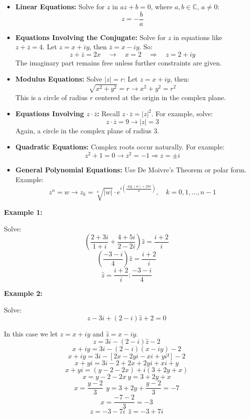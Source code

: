 \begin{itemize}[label=\(-\)]
	\item \textbf{Linear Equations:}
	      Solve for \( z \) in \( az + b = 0 \), where \( a, b \in \mathbb{C} \), \( a \neq 0 \):
	      \[
		      z = -\frac{b}{a}
	      \]

	\item \textbf{Equations Involving the Conjugate:}
	      Solve for \( z \) in equations like \( z + \overline{z} = 4 \).
	      Let \( z = x + iy \), then \( \overline{z} = x - iy \). So:
	      \[
		      z + \overline{z} = 2x \quad \to \quad x = 2 \quad \Rightarrow \quad z = 2 + iy
	      \]
	      The imaginary part remains free unless further constraints are given.

	\item \textbf{Modulus Equations:}
	      Solve \( |z| = r \):
	      Let \( z = x + iy \), then:
	      \[
		      \sqrt{x^2 + y^2} = r \to x^2 + y^2 = r^2
	      \]
	      This is a circle of radius \( r \) centered at the origin in the complex plane.

	\item \textbf{Equations Involving \( z \cdot \overline{z} \):}
	      Recall \( z \cdot \overline{z} = |z|^2 \).
	      For example, solve:
	      \[
		      z \cdot \overline{z} = 9 \to |z| = 3
	      \]
	      Again, a circle in the complex plane of radius 3.

	\item \textbf{Quadratic Equations:}
	      Complex roots occur naturally. For example:
	      \[
		      z^2 + 1 = 0 \to z^2 = -1 \Rightarrow z = \pm i
	      \]

	\item \textbf{General Polynomial Equations:}
	      Use De Moivre’s Theorem or polar form. Example:
	      \[
		      z^n = w \to z_k = \sqrt[n]{|w|} \cdot e^{i\left( \frac{\arg(w) + 2k\pi}{n} \right)}, \quad k = 0, 1, \dots, n-1
	      \]
\end{itemize}

\textbf{Example 1:}

Solve:
\[
	\left( \frac{2 + 3i}{1 + i} + \frac{4 + 5i}{2 - 2i}\right) \hat{z} = \frac{i + 2}{i}
\]
\[
	\left( \frac{-3 -i}{4} \right) \hat{z} = \frac{i + 2}{i}
\]
\[
	\hat{z} = \frac{i + 2}{i} : \frac{-3 -i}{4}
\]

\textbf{Example 2:}

Solve:
\[
	z - 3i + (2 -i)\hat{z} + 2 = 0
\]

In this case we let \( z = x + iy \) and \( \hat{z} = x - iy \).
\[
	z = 3i - (2 - i)\hat{z} - 2
\]
\[
	x + iy = 3i - (2 - i)(x - iy) - 2
\]
\[
	x + iy = 3i - [2x - 2yi -xi +yi²] - 2
\]
\[
	x + yi = 3i - 2 + 2x + 2yi + xi + y
\]
\[
	x + yi = (y - 2 -2x) + i(3 + 2y + x)
\]
\[
	x = y - 2 -2x\ y = 3 + 2y + x
\]
\[
	x = \frac{y - 2}{3}\ \ y = 3 + 2y + \frac{y-2}{3} = -7
\]
\[
	x = \frac{-7 -2}{3} = -3
\]
\[
	z = -3 -7i\ \ \hat{z} = -3 + 7i
\]
